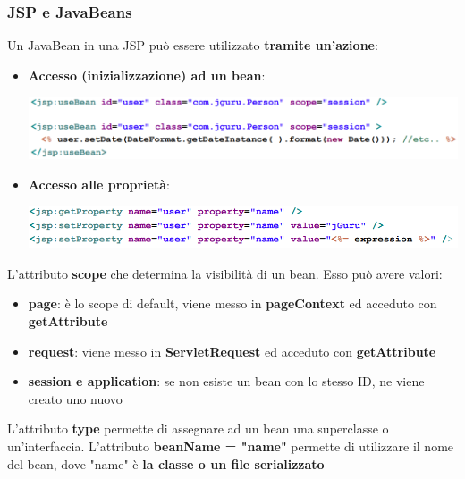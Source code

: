 \documentclass[12pt]{article}
\begin{document}
\subsubsection{JSP e JavaBeans}
Un JavaBean in una JSP può essere utilizzato \textbf{tramite un'azione}:
\begin{itemize}
    \item \textbf{Accesso (inizializzazione) ad un bean}:
    \begin{center}
        \includegraphics[width = 1\textwidth]{Images/204.png}
    \end{center}
    \item \textbf{Accesso alle proprietà}:
    \begin{center}
        \includegraphics[width = 1\textwidth]{Images/205.png}
    \end{center}
\end{itemize}
L'attributo \textbf{scope} che determina la visibilità di un bean. Esso può avere valori:
\begin{itemize}
    \item \textbf{page}: è lo scope di default, viene messo in \textbf{pageContext} ed acceduto con \textbf{getAttribute}
    \item \textbf{request}: viene messo in \textbf{ServletRequest} ed acceduto con \textbf{getAttribute}
    \item \textbf{session e application}: se non esiste un bean con lo stesso ID, ne viene creato uno nuovo
\end{itemize}
L'attributo \textbf{type} permette di assegnare ad un bean una superclasse o un'interfaccia.
L'attributo \textbf{beanName = "name"} permette di utilizzare il nome del bean, dove "name" è \textbf{la classe o un file serializzato}
\end{document}
